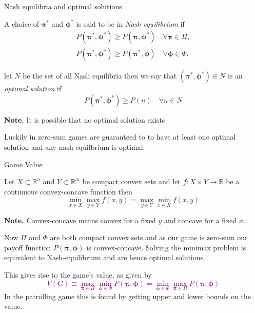 \documentclass[11pt]{beamer}
\begin{document}
\begin{frame}{Nash equilibria and optimal solutions}
\begin{definition}
A choice of $\bm{\pi}^*$ and $\bm{\phi}^*$ is said to be in \textit{Nash equilibrium} if 
\begin{align*}
P(\bm{\pi}^*,\bm{\phi}^*) \geq P(\bm{\pi},\bm{\phi}^*) \quad \forall \bm{\pi} \in \Pi , \\
P(\bm{\pi}^*,\bm{\phi}^*) \geq P(\bm{\pi}^*,\bm{\phi}) \quad \forall \bm{\phi} \in \Phi .
\end{align*}
\end{definition}

\pause

\begin{definition}
let $N$ be the set of all Nash equilibria then we say that $(\bm{\pi}^{*},\bm{\phi}^{*}) \in N$ is an \textit{optimal solution} if
$$P(\bm{\pi}^{*},\bm{\phi}^{*}) \geq P(n) \quad \forall n \in N$$ 
\end{definition}

\textbf{Note.} It is possible that no optimal solution exists

\pause

Luckily in zero-sum games are guaranteed to to have at least one optimal solution and any nash-equilbrium is optimal.

\end{frame}

\begin{frame}{Game Value}

\begin{theorem}
Let $X \subset \mathbb{R}^{n}$ and $Y \subset \mathbb{R}^{m}$ be compact convex sets and let $f: X \times Y \rightarrow \mathbb{R}$ be a continuous convex-concave function then
$$\min\limits_{x \in X} \max\limits_{y \in Y} f(x,y) = \max\limits_{y \in Y} \min\limits_{x \in X} f(x,y) $$
\end{theorem}

\textbf{Note.} Convex-concave means convex for a fixed $y$ and concave for a fixed $x$.

\pause
Now $\Pi$ and $\Phi$ are both compact convex sets and as our game is zero-sum our payoff function $P(\bm{\pi},\bm{\phi})$ is convex-concave. Solving the minimax problem is equivalent to Nash-equilibrium and are hence optimal solutions.


This gives rise to the game's value, as given by \textcolor{purple}{$$V(G) \equiv \max\limits_{\bm{\pi} \in \Pi} \min\limits_{\bm{\phi} \in \Phi} P(\bm{\pi},\bm{\phi})=\min\limits_{\bm{\phi} \in \Phi} \max\limits_{\bm{\pi} \in \Pi} P(\bm{\pi},\bm{\phi})$$}
In the patrolling game this is found by getting upper and lower bounds on the value.
\end{frame}
\end{document}
